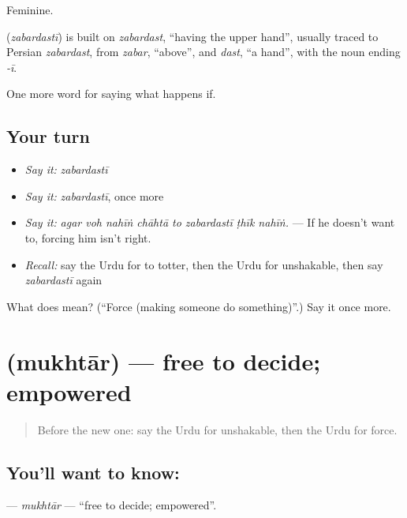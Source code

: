 Feminine.

\begin{cousinweb}
\textbf{} (\emph{zabardastī}) is built on \emph{zabardast}, \textquotedblleft{}having the upper hand\textquotedblright{}, usually traced to Persian \emph{zabardast}, from \emph{zabar}, \textquotedblleft{}above\textquotedblright{}, and \emph{dast}, \textquotedblleft{}a hand\textquotedblright{}, with the noun ending \emph{-ī}.
\end{cousinweb}

\begin{grammarlens}[title={What you've built}]
One more word for saying what happens if.
\end{grammarlens}

\subsection*{Your turn}
\begin{itemize}
\raggedright
  \item \emph{Say it:} \emph{zabardastī}
  \item \emph{Say it:} \emph{zabardastī}, once more
  \item \emph{Say it:} \emph{agar voh nahīṅ chāhtā to zabardastī ṭhīk nahīṅ.} — If he doesn't want to, forcing him isn't right.
  \item \emph{Recall:} say the Urdu for to totter, then the Urdu for unshakable, then say \emph{zabardastī} again
\end{itemize}

\begin{tcolorbox}[breakable,colback=teal!4,colframe=teal!35!black,title={Before you move on}]
What does  mean? (\textquotedblleft{}Force (making someone do something)\textquotedblright{}.) Say it once more.
\end{tcolorbox}
\section[\texorpdfstring{\ur{مختار} (mukhtār)}{مختار (mukhtār)}]{ (mukhtār) — free to decide; empowered}

\label{lesson:UR-C539-mukhtar}



\begin{quote}
Before the new one: say the Urdu for unshakable, then the Urdu for force.
\end{quote}

\subsection*{You'll want to know: }
\textbf{} — \emph{mukhtār} — \textquotedblleft{}free to decide; empowered\textquotedblright{}.

